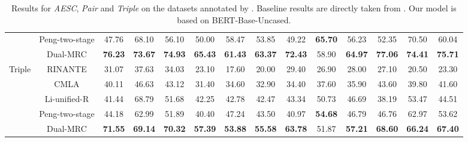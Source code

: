 \documentclass[letterpaper]{article} \usepackage{aaai21}  \usepackage{times}  \usepackage{helvet} \usepackage{courier}  \usepackage[hyphens]{url}  \usepackage{graphicx} \urlstyle{rm} \def\UrlFont{\rm}  \usepackage{natbib}  \usepackage{caption}
\begin{document}
\begin{table*}
\begin{tabular}{cc|ccc|ccc|ccc|ccc}
    \multicolumn{1}{c|}{}                        & Peng-two-stage & 47.76 & 68.10 & 56.10          & 50.00 & 58.47 & 53.85          & 49.22 & \textbf{65.70} & 56.23          & 52.35 & 70.50 & 60.04          \\ \cline{2-14}
    \multicolumn{1}{c|}{}                        & Dual-MRC       & \textbf{76.23} & \textbf{73.67} & \textbf{74.93} & \textbf{65.43} & \textbf{61.43} & \textbf{63.37} & \textbf{72.43} & 58.90 & \textbf{64.97} & \textbf{77.06} & \textbf{74.41} & \textbf{75.71} \\ \hline
    \multicolumn{1}{c|}{\multirow{5}{*}{Triple}} & RINANTE        & 31.07 & 37.63 & 34.03          & 23.10 & 17.60 & 20.00          & 29.40 & 26.90 & 28.00          & 27.10 & 20.50 & 23.30          \\
    \multicolumn{1}{c|}{}                        & CMLA           & 40.11 & 46.63 & 43.12          & 31.40 & 34.60 & 32.90          & 34.40 & 37.60 & 35.90          & 43.60 & 39.80 & 41.60          \\
    \multicolumn{1}{c|}{}                        & Li-unified-R   & 41.44 & 68.79 & 51.68          & 42.25 & 42.78 & 42.47          & 43.34 & 50.73 & 46.69          & 38.19 & 53.47 & 44.51          \\
    \multicolumn{1}{c|}{}                        & Peng-two-stage & 44.18 & 62.99 & 51.89          & 40.40 & 47.24 & 43.50          & 40.97 & \textbf{54.68} & 46.79          & 46.76 & 62.97 & 53.62          \\ \cline{2-14}
    \multicolumn{1}{c|}{}                        & Dual-MRC       & \textbf{71.55} & \textbf{69.14} &\textbf{70.32}  & \textbf{57.39} & \textbf{53.88} & \textbf{55.58} & \textbf{63.78} & 51.87 & \textbf{57.21} & \textbf{68.60} & \textbf{66.24} & \textbf{67.40} \\ \hline
    \end{tabular} 
    \caption{Results for \emph{AESC}, \emph{Pair} and \emph{Triple} on the datasets annotated by \cite{peng2020knowing}. 
    Baseline results are directly taken from \cite{peng2020knowing}. Our model is based on BERT-Base-Uncased.}
    \label{exp_3}
    \end{table*}
\end{document}
